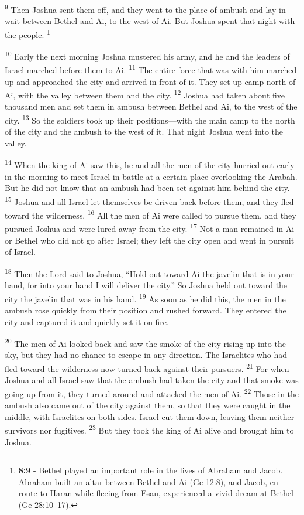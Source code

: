 \documentclass[12pt,twoside]{article}
\newcommand{\vs}[1]{\textsuperscript{#1}}
\newcommand{\vnote}[2]{%
  \begingroup
  \renewcommand\thefootnote{}%
  \footnote{\scriptsize \textbf{}#2}%
  \addtocounter{footnote}{-1}%
  \endgroup
}
\begin{document}
\vs{9} Then Joshua sent them off, and they went to the place of ambush and lay in wait between Bethel and Ai, to the west of Ai. But Joshua spent that night with the people.\vnote{9}{\textbf{8:9} - Bethel played an important role in the lives of Abraham and Jacob. Abraham built an altar between Bethel and Ai (Ge 12:8), and Jacob, en route to Haran while fleeing from Esau, experienced a vivid dream at Bethel (Ge 28:10–17).}

\vs{10} Early the next morning Joshua mustered his army, and he and the leaders of Israel marched before them to Ai.
\vs{11} The entire force that was with him marched up and approached the city and arrived in front of it. They set up camp north of Ai, with the valley between them and the city.
\vs{12} Joshua had taken about five thousand men and set them in ambush between Bethel and Ai, to the west of the city.
\vs{13} So the soldiers took up their positions---with the main camp to the north of the city and the ambush to the west of it. That night Joshua went into the valley.

\vs{14} When the king of Ai saw this, he and all the men of the city hurried out early in the morning to meet Israel in battle at a certain place overlooking the Arabah. But he did not know that an ambush had been set against him behind the city.
\vs{15} Joshua and all Israel let themselves be driven back before them, and they fled toward the wilderness.
\vs{16} All the men of Ai were called to pursue them, and they pursued Joshua and were lured away from the city.
\vs{17} Not a man remained in Ai or Bethel who did not go after Israel; they left the city open and went in pursuit of Israel.

\vs{18} Then the Lord said to Joshua, ``Hold out toward Ai the javelin that is in your hand, for into your hand I will deliver the city.'' So Joshua held out toward the city the javelin that was in his hand.
\vs{19} As soon as he did this, the men in the ambush rose quickly from their position and rushed forward. They entered the city and captured it and quickly set it on fire.

\vs{20} The men of Ai looked back and saw the smoke of the city rising up into the sky, but they had no chance to escape in any direction. The Israelites who had fled toward the wilderness now turned back against their pursuers.
\vs{21} For when Joshua and all Israel saw that the ambush had taken the city and that smoke was going up from it, they turned around and attacked the men of Ai.
\vs{22} Those in the ambush also came out of the city against them, so that they were caught in the middle, with Israelites on both sides. Israel cut them down, leaving them neither survivors nor fugitives.
\vs{23} But they took the king of Ai alive and brought him to Joshua.
\end{document}
